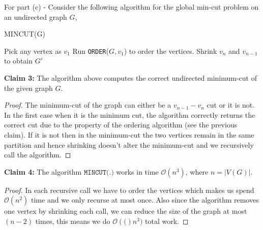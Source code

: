\documentclass{article}
\numberwithin{equation}{section}
\newcommand{\bigOh}[1]{\mathcal{O}\left(#1\right)}
\begin{document}
    \noindent For part (c) - Consider the following algorithm for the global min-cut problem on an undirected graph $G$, 
    \begin{algorithm}[H]
        \caption{MINCUT(G)}
        \begin{algorithmic}[1]
            \State Pick any vertex as $v_1$
            \State Run \texttt{ORDER}($G, v_1$) to order the vertices. 
            \Statex
                \State {}
            \Else
                \State Shrink $v_n$ and $v_{n-1}$ to obtain $G'$
                \State {}
            \EndIf
        \end{algorithmic}
    \end{algorithm}
\noindent \textbf{Claim 3:} The algorithm above computes the correct undirected minimum-cut of the given graph $G$. 
\begin{proof}
    The minimum-cut of the graph can either be a $v_{n-1}-v_n$ cut or it is not. In the first case when it is the minimum cut, the algorithm correctly returns the correct cut due to the property of the ordering algorithm (see the previous claim). If it is not then in the minimum-cut the two vertices remain in the same partition and hence shrinking doesn't alter the minimum-cut and we recursively call the algorithm. 
\end{proof}
\noindent \textbf{Claim 4:} The algorithm $\texttt{MINCUT(.)}$ works in time $\mathcal{O}(n^3)$, where $n=|V(G)|$. 
\begin{proof}
    In each recursive call we have to order the vertices which makes us spend $\bigOh{n^2}$ time and we only recurse at most once. Also since the algorithm removes one vertex by shrinking each call, we can reduce the size of the graph at most $(n-2)$ times, this means we do $\bigOh(n^3)$ total work. 
\end{proof}
\newpage 
\end{document}
